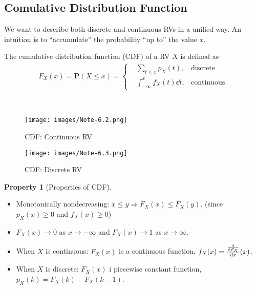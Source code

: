 \documentclass[device=normal, lang=en, fontsize=12pt]{elegantnote}
\numberwithin{equation}{section}
\theoremstyle{definition} %
\newtheorem{property}{Property}[section] %
\begin{document}
\subsection{Comulative Distribution Function}
We want to describe both discrete and continuous RVs in a unified way. An intuition is to ``accumulate'' the probability ``up to'' the value $x$.
\begin{definition}[CDF]
    The cumulative distribution function (CDF) of a RV $X$ is defined as
    \begin{align}
        F_{X}(x) = \mathbf{P}(X \leq x) = \left\{
        \begin{aligned}
            &\sum_{t \leq x} p_{X}(t), &\text{discrete} \\ 
            &\int_{-\infty}^{x} f_{X}(t) \dd{t}, &\text{continuous}
        \end{aligned}
        \right.
    \end{align}
\end{definition}
\begin{example} ~
    \begin{figure}[H]
        \centering
        \texttt{[image: images/Note-6.2.png]}
        \caption{CDF: Continuous RV}
    \end{figure}
    \begin{figure}[H]
        \centering
        \texttt{[image: images/Note-6.3.png]}
        \caption{CDF: Discrete RV}
    \end{figure}
\end{example}
\begin{property}[Properties of CDF] ~
    \begin{itemize}
        \item Monotonically nondecreasing: $x \leq y \Rightarrow F_{X}(x) \leq F_{X}(y)$. (since $p_{X}(x) \geq 0$ and $f_{X}(x) \geq 0$)
        \item $F_X(x) \to 0$ as $x \to -\infty$ and $F_X(x) \to 1$ as $x \to \infty$.
        \item When $X$ is continuous: $F_{X}(x)$ is a continuous function, $f_{X}(x) = \frac{\dv{F_{X}}}{\dd{x}}(x)$.
        \item When $X$ is discrete: $F_{X}(x)$ i piecewise constant function, $p_{X}(k) = F_{X}(k) - F_{X}(k-1)$.
    \end{itemize}
\end{property}
\end{document}
